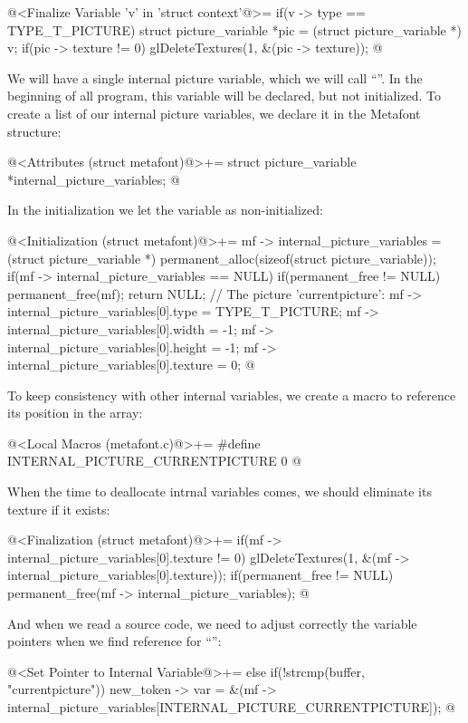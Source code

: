\iniciocodigo
@<Finalize Variable 'v' in 'struct context'@>=
if(v -> type == TYPE_T_PICTURE){
  struct picture_variable *pic = (struct picture_variable *) v;
  if(pic -> texture != 0)
    glDeleteTextures(1, &(pic -> texture));
}
@
\fimcodigo

We will have a single internal picture variable, which we will call
``''. In the beginning of all program, this
variable will be declared, but not initialized. To create a list of
our internal picture variables, we declare it in the Metafont
structure:

\iniciocodigo
@<Attributes (struct metafont)@>+=
struct picture_variable *internal_picture_variables;
@
\fimcodigo

In the initialization we let the variable as non-initialized:

\iniciocodigo
@<Initialization (struct metafont)@>+=
mf -> internal_picture_variables = (struct picture_variable *)
                                   permanent_alloc(sizeof(struct picture_variable));
if(mf -> internal_picture_variables == NULL){
  if(permanent_free != NULL)
    permanent_free(mf);
  return NULL;
}
// The picture 'currentpicture':
mf -> internal_picture_variables[0].type = TYPE_T_PICTURE;
mf -> internal_picture_variables[0].width = -1;
mf -> internal_picture_variables[0].height = -1;
mf -> internal_picture_variables[0].texture = 0;
@
\fimcodigo

To keep consistency with other internal variables, we create a macro
to reference its position in the array:

\iniciocodigo
@<Local Macros (metafont.c)@>+=
#define INTERNAL_PICTURE_CURRENTPICTURE 0
@
\fimcodigo

When the time to deallocate intrnal variables comes, we should
eliminate its texture if it exists:

\iniciocodigo
@<Finalization (struct metafont)@>+=
if(mf -> internal_picture_variables[0].texture != 0)
  glDeleteTextures(1, &(mf -> internal_picture_variables[0].texture));
if(permanent_free != NULL)
  permanent_free(mf -> internal_picture_variables);
@
\fimcodigo

And when we read a source code, we need to adjust correctly the
variable pointers when we find reference for
``'':

\iniciocodigo
@<Set Pointer to Internal Variable@>+=
else if(!strcmp(buffer, "currentpicture"))
  new_token -> var =
          &(mf -> internal_picture_variables[INTERNAL_PICTURE_CURRENTPICTURE]);
@
\fimcodigo

